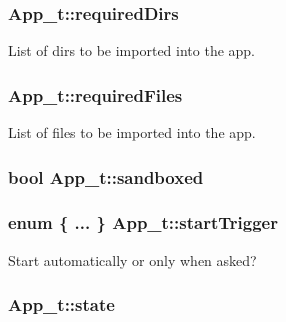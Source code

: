 \subsubsection[{\texorpdfstring{required\+Dirs}{requiredDirs}}]{ App\+\_\+t\+::required\+Dirs}\hypertarget{struct_app__t_a09f9b61df8fe308408bc4eb8b35252e3}{}\label{struct_app__t_a09f9b61df8fe308408bc4eb8b35252e3}


List of dirs to be imported into the app. 

\subsubsection[{\texorpdfstring{required\+Files}{requiredFiles}}]{ App\+\_\+t\+::required\+Files}\hypertarget{struct_app__t_a90425c1ff75f7e53cee33d9fa874a41f}{}\label{struct_app__t_a90425c1ff75f7e53cee33d9fa874a41f}


List of files to be imported into the app. 

\subsubsection[{\texorpdfstring{sandboxed}{sandboxed}}]{\setlength{\rightskip}{0pt plus 5cm}bool App\+\_\+t\+::sandboxed}\hypertarget{struct_app__t_a56a1a7fd3515e4b30fa7d7ebe1e25528}{}\label{struct_app__t_a56a1a7fd3515e4b30fa7d7ebe1e25528}
\subsubsection[{\texorpdfstring{start\+Trigger}{startTrigger}}]{\setlength{\rightskip}{0pt plus 5cm}enum \{ ... \}   App\+\_\+t\+::start\+Trigger}\hypertarget{struct_app__t_ad654e0b454b6387c9fa7398e20b35135}{}\label{struct_app__t_ad654e0b454b6387c9fa7398e20b35135}


Start automatically or only when asked? 

\subsubsection[{\texorpdfstring{state}{state}}]{ App\+\_\+t\+::state}\hypertarget{struct_app__t_a7c4d567f8dc13e91498fa3a5cd7a02d0}{}\label{struct_app__t_a7c4d567f8dc13e91498fa3a5cd7a02d0}
